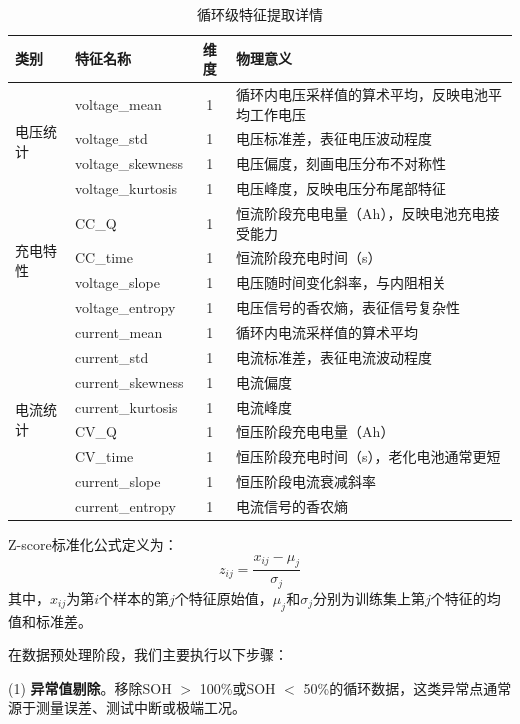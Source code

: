 \documentclass[10pt,a4paper]{ctexart}
\begin{document}
\begin{table}[H]
\centering
\caption{循环级特征提取详情}
\label{tab:features}
\begin{tabular}{@{}llcp{6cm}@{}}
\toprule
\textbf{类别} & \textbf{特征名称} & \textbf{维度} & \textbf{物理意义} \\
\midrule
\multirow{4}{*}{电压统计} 
& voltage\_mean & 1 & 循环内电压采样值的算术平均，反映电池平均工作电压 \\
& voltage\_std & 1 & 电压标准差，表征电压波动程度 \\
& voltage\_skewness & 1 & 电压偏度，刻画电压分布不对称性 \\
& voltage\_kurtosis & 1 & 电压峰度，反映电压分布尾部特征 \\
\midrule
\multirow{4}{*}{充电特性} 
& CC\_Q & 1 & 恒流阶段充电电量（Ah），反映电池充电接受能力 \\
& CC\_time & 1 & 恒流阶段充电时间（s） \\
& voltage\_slope & 1 & 电压随时间变化斜率，与内阻相关 \\
& voltage\_entropy & 1 & 电压信号的香农熵，表征信号复杂性 \\
\midrule
\multirow{8}{*}{电流统计} 
& current\_mean & 1 & 循环内电流采样值的算术平均 \\
& current\_std & 1 & 电流标准差，表征电流波动程度 \\
& current\_skewness & 1 & 电流偏度 \\
& current\_kurtosis & 1 & 电流峰度 \\
& CV\_Q & 1 & 恒压阶段充电电量（Ah） \\
& CV\_time & 1 & 恒压阶段充电时间（s），老化电池通常更短 \\
& current\_slope & 1 & 恒压阶段电流衰减斜率 \\
& current\_entropy & 1 & 电流信号的香农熵 \\
\bottomrule
\end{tabular}
\end{table}

Z-score标准化公式定义为：
\begin{equation}
    z_{ij} = \frac{x_{ij} - \mu_j}{\sigma_j}
\end{equation}
其中，$x_{ij}$为第$i$个样本的第$j$个特征原始值，$\mu_j$和$\sigma_j$分别为训练集上第$j$个特征的均值和标准差。

在数据预处理阶段，我们主要执行以下步骤：

(1) \textbf{异常值剔除}。移除SOH $>$ 100\%或SOH $<$ 50\%的循环数据，这类异常点通常源于测量误差、测试中断或极端工况。
\end{document}
